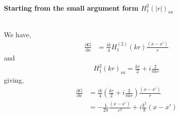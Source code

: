 \documentclass{article}
\newcommand{\0}{\varnothing}
\begin{document}
{\ \\ \centering \bf Starting from the small argument form $H_1^2(|r|)_{sa}$\ \\\ \\}\textbf{}

 We have,
\begin{align*}
    \frac{\partial G}{\partial x} &= \frac{ik}{4}  H_{1}^{(2)}(kr) \frac{(x-x')}{r}
\end{align*}
and
\begin{align*}
        H_1^2(kr)_{sa} = \frac{kr}{2} + i  \frac{2}{\pi kr}
\end{align*}
giving, 
\begin{align*}
    \frac{\partial G}{\partial x} &= \frac{ik}{4} \left( \frac{kr}{2} + i  \frac{2}{\pi kr} \right) \frac{(x-x')}{r}\\
    &=   - \frac{1}{2 \pi } \frac{(x-x')}{r^2} + i\frac{k^2}{8}(x-x')\\
\end{align*}
\end{document}
